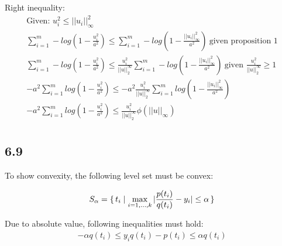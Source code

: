 \documentclass[12pt]{article}
\begin{document}
Right inequality:
\begin{equation*}
\begin{aligned}
\text{Given: } u_{i}^{2} \le ||u_i||_{\infty}^{2}\\
\sum_{i=1}^{m}-log(1 - \frac{u_{i}^{2}}{a^2}) \le \sum_{i=1}^{m}-log(1 - \frac{||u_{i}||_{\infty}^{2}}{a^2})\ \text{given proposition 1}\\
\sum_{i=1}^{m}-log(1 - \frac{u_{i}^{2}}{a^2}) \le \frac{u_{i}^{2}}{||u||_{2}^{\infty}}\sum_{i=1}^{m}-log(1 - \frac{||u_{i}||_{\infty}^{2}}{a^2})\ \text{given $\frac{u_{i}^{2}}{||u||_{2}^{\infty}} \ge 1$}\\
-a^2\sum_{i=1}^{m}log(1 - \frac{u_{i}^{2}}{a^2}) \le -a^2\frac{u_{i}^{2}}{||u||_{2}^{\infty}}\sum_{i=1}^{m}log(1 - \frac{||u_{i}||_{\infty}^{2}}{a^2})\\
-a^2\sum_{i=1}^{m}log(1 - \frac{u_{i}^{2}}{a^2}) \le \frac{u_{i}^{2}}{||u||_{2}^{\infty}}\phi(||u||_{\infty})\\
\end{aligned}
\end{equation*}

\subsection*{6.9}
To show convexity, the following level set must be convex:

$$S_{\alpha} = \set{t_i| \max_{i=1,\dots,k}|\frac{p(t_i)}{q(t_i)} - y_i| \le \alpha}$$

Due to absolute value, following inequalities must hold:
\begin{equation*}
\begin{aligned}
-\alpha q(t_i) \le y_i q(t_i)-p(t_i) \le \alpha q(t_i)
\end{aligned}
\end{equation*}

\begin{equation*}
\begin{aligned}
\end{aligned}
\end{equation*}

 
\end{document}
